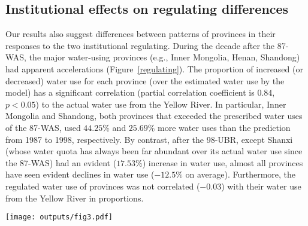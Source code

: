 \subsection{Institutional effects on regulating differences}
\label{result-3}
Our results also suggest differences between patterns of provinces in their responses to the two institutional regulating.
During the decade after the 87-WAS, the major water-using provinces (e.g., Inner Mongolia, Henan, Shandong) had apparent accelerations (Figure~\ref{regulating}).
The proportion of increased (or decreased) water use for each province (over the estimated water use by the model) has a significant correlation (partial correlation coefficient is $0.84$, $p<0.05$) to the actual water use from the Yellow River.
In particular, Inner Mongolia and Shandong, both provinces that exceeded the prescribed water uses of the 87-WAS, used $44.25\%$ and $25.69\%$ more water uses than the prediction from 1987 to 1998, respectively.
By contrast, after the 98-UBR, except Shanxi (whose water quota has always been far abundant over its actual water use since the 87-WAS) had an evident ($17.53\%$) increase in water use, almost all provinces have seen evident declines in water use ($-12.5\%$ on average).
Furthermore, the regulated water use of provinces was not correlated ($-0.03$) with their water use from the Yellow River in proportions.

\begin{figure*}[!h]
    \centering
    \texttt{[image: outputs/fig3.pdf]}
    \caption{
        Regulating differences for provinces in the YRB.
        Red and green bars denote actual water use over the estimation from the model in a decade after the institutional shift -the 87-WAS and the 98-UBR, respectively.
        The grey bars indicate the proportions of actual water use for each province to total water use of the provinces in a decade after the institutional shift.
        The triangles mark the water quotas assigned in the institution, scaled into ratios by the same total actual water use, too.
    }
    \label{regulating}
\end{figure*}
